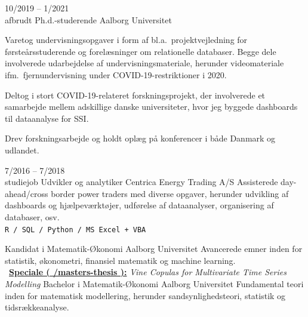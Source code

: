 \documentclass[9pt]{template/developercv}
\newcommand{\link}[2]{\faLink~\href{#1}{\textbf{#2}}}
\begin{document}
\begin{entrylist}
  \entry
  {10/2019 -- 1/2021\\{\footnotesize afbrudt}}
  {Ph.d.-studerende}
  {Aalborg Universitet}
  {
    Varetog undervisningsopgaver i form af bl.a.\ projektvejledning for førsteårsstuderende og forelæsninger om relationelle databaser.
    Begge dele involverede udarbejdelse af undervisningsmateriale, herunder videomateriale ifm.\ fjernundervisning under COVID-19-restriktioner i 2020.

    Deltog i stort COVID-19-relateret forskningsprojekt, der involverede et samarbejde mellem adskillige danske universiteter, hvor jeg byggede dashboards til dataanalyse for SSI.

    Drev forskningsarbejde og holdt oplæg på konferencer i både Danmark og udlandet.
  }

  \entry
  {7/2016 -- 7/2018\\{\footnotesize studiejob}}
  {Udvikler og analytiker}
  {Centrica Energy Trading A/S}
  {
    Assisterede day-ahead/cross border power traders med diverse opgaver, herunder udvikling af dashboards og hjælpeværktøjer, udførelse af dataanalyser, organisering af databaser, osv.
    \\
    \texttt{R / SQL / Python / MS Excel + VBA}
  }
\end{entrylist}

\begin{entrylist}
   {Kandidat i Matematik-Økonomi} {Aalborg Universitet} {
    Avancerede emner inden for statistik, økonometri, finansiel matematik og machine learning.\\
    \link{https://github.com/janusvm/masters-thesis}{Speciale ( \faGithub/masters-thesis ):}
    \emph{Vine Copulas for Multivariate Time Series Modelling}
  }
   {Bachelor i Matematik-Økonomi} {Aalborg Universitet} {
    Fundamental teori inden for matematisk modellering, herunder sandsynlighedsteori, statistik og tidsrækkeanalyse.
  }
\end{entrylist}
\end{document}

